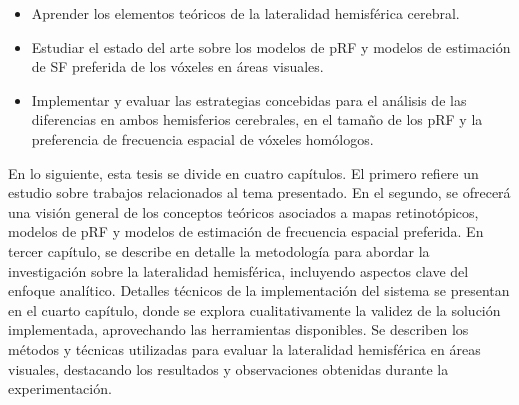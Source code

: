 \begin{itemize}
	\item Aprender los elementos te\'oricos de la lateralidad hemisf\'erica cerebral.
	
	\item Estudiar el estado del arte sobre los modelos de pRF y modelos de estimaci\'on de SF preferida de los v\'oxeles en \'areas visuales.
	
	\item Implementar y evaluar las estrategias concebidas para el an\'alisis de las diferencias en ambos hemisferios cerebrales, en el tama\~no de los pRF y la preferencia de frecuencia espacial de v\'oxeles hom\'ologos.
	
\end{itemize}
En lo siguiente, esta tesis se divide en cuatro capítulos. El primero refiere un estudio sobre trabajos relacionados al tema presentado. En el segundo, se ofrecerá una visión general de los conceptos teóricos asociados a mapas retinot\'opicos, modelos de pRF y modelos de estimaci\'on de frecuencia espacial preferida. En tercer cap\'itulo, se describe en detalle la metodología para abordar la investigación sobre la lateralidad hemisférica, incluyendo aspectos clave del enfoque analítico. Detalles técnicos de la implementación del sistema se presentan en el cuarto cap\'itulo, donde se explora cualitativamente la validez de la solución implementada, aprovechando las herramientas disponibles. Se describen los métodos y técnicas utilizadas para evaluar la lateralidad hemisférica en áreas visuales, destacando los resultados y observaciones obtenidas durante la experimentación.
	



